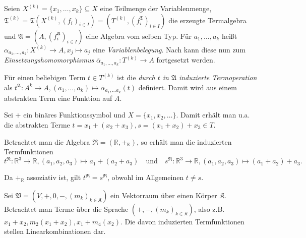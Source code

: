 \vspace*{-\lineskip}

\begin{definition}
    Seien $X^{(k)} = \{x_1, \ldots, x_k\} \subseteq X$ eine Teilmenge der Variablenmenge, $\mathfrak{T}^{(k)} = \mathfrak{T}(X^{(k)}, (f_i)_{i \in I}) = (T^{(k)}, (f_i^\mathfrak{T})_{i \in I})$ die erzeugte Termalgebra und $\mathfrak{A} = (A, (f_i^\mathfrak{A})_{i \in I})$ eine Algebra vom selben Typ. Für $a_1, \ldots, a_k$ heißt $\alpha_{a_1, \ldots, a_k}: X^{(k)} \to A, x_j \mapsto a_j$ eine \emph{Variablenbelegung}. Nach  kann diese nun zum \emph{Einsetzungshomomorphismus} $\overline{\alpha}_{a_1, \ldots, a_k}: T^{(k)} \to A$ fortgesetzt werden.

    Für einen beliebigen Term $t \in T^{(k)}$ ist die \emph{durch $t$ in $\mathfrak{A}$ induzierte Termoperation} als $t^\mathfrak{A}: A^k \to A, (a_1, \ldots, a_k) \mapsto \overline{\alpha}_{a_1, \ldots a_k}(t)$ definiert. Damit wird aus einem abstrakten Term eine Funktion auf $A$.
\end{definition}

\begin{example}
    Sei $+$ ein binäres Funktionssymbol und $X = \{x_1, x_2, \ldots \}$. Damit erhält man u.a. die abstrakten Terme $t = x_1 + (x_2 + x_3), s = (x_1 + x_2) + x_3 \in T$.

    Betrachtet man die Algebra $\mathfrak{R} = (\mathbb{R}, +_\mathbb{R})$, so erhält man die induzierten Termfunktionen $$t^\mathfrak{R}: \mathbb{R}^3 \to \mathbb{R}, (a_1, a_2, a_3) \mapsto a_1 + (a_2 + a_3) \quad \text{und} \quad s^\mathfrak{R}: \mathbb{R}^3 \to \mathbb{R}, (a_1, a_2, a_3) \mapsto (a_1 + a_2) + a_3.$$

    Da $+_\mathbb{R}$ assoziativ ist, gilt $t^\mathfrak{R} = s^\mathfrak{R}$, obwohl im Allgemeinen $t \neq s$.
\end{example}

\begin{example}
    Sei $\mathfrak{V} = (V, +, 0, -, (m_k)_{k \in \mathfrak{K}})$ ein Vektorraum über einen Körper $\mathfrak{K}$. Betrachtet man Terme über die Sprache $(+, -, (m_k)_{k \in \mathfrak{K}})$, also z.B. $x_1 + x_2, m_2(x_1 + x_2), x_1 + m_4(x_2)$. Die davon induzierten Termfunktionen stellen Linearkombinationen dar.
\end{example}